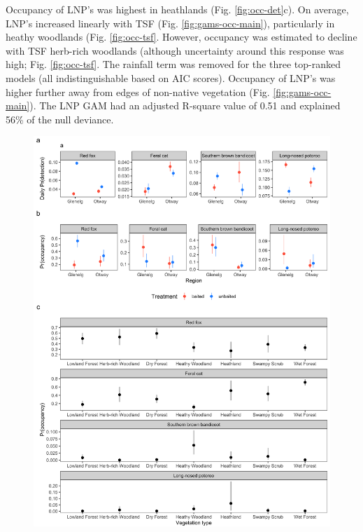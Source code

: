 \documentclass[11pt,a4paper,titlepage,twoside,openright]{style/unimelbthesis}
\begin{document}
\begin{mainmatter}
Occupancy of LNP's was highest in heathlands (Fig. \ref{fig:occ-det}c). On average, LNP's increased linearly with TSF (Fig. \ref{fig:gams-occ-main}), particularly in heathy woodlands (Fig. \ref{fig:occ-tsf}. However, occupancy was estimated to decline with TSF herb-rich woodlands (although uncertainty around this response was high; Fig. \ref{fig:occ-tsf}. The rainfall term was removed for the three top-ranked models (all indistinguishable based on AIC scores). Occupancy of LNP's was higher further away from edges of non-native vegetation (Fig. \ref{fig:gams-occ-main}). The LNP GAM had an adjusted R-square value of 0.51 and explained 56\% of the null deviance.

\newpage
\begin{figure}

{\centering \includegraphics[width=1\linewidth]{figure/occ_det_ubms} 

}


\end{figure}
\end{mainmatter}
\end{document}
